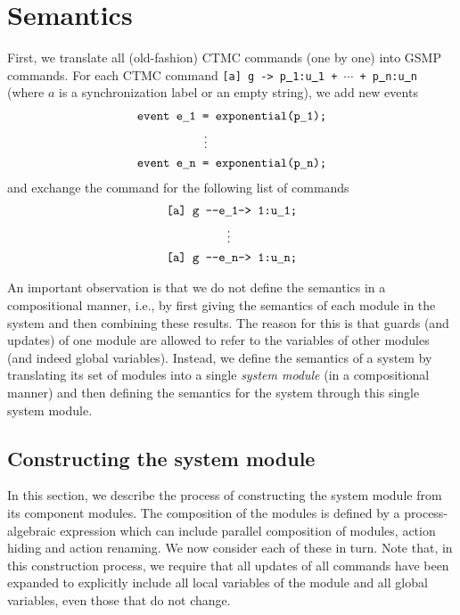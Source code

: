 \documentclass{article}
\renewcommand{\_}{\underline{~}}
\newcommand{\code}[1]{\texttt{#1}}
\begin{document}
\section*{Semantics}

First, we translate all (old-fashion) CTMC commands (one by one) into GSMP commands.
For each CTMC command \code{[a] g -> p\_1:u\_1 + $\cdots$ + p\_n:u\_n} (where $a$ is a synchronization label or an empty string), we add 
new events 
\begin{align*}
	\code{event e\_1 } &\code{= exponential(p\_1);} \\
	&\hspace*{0.47mm}\vdots \\
	\code{event e\_n } &\code{= exponential(p\_n);}
\end{align*}
and exchange the command for the following list of commands
\begin{align*}
	\code{[a] g } &\code{{-}{-}e\_1-> 1:u\_1;} \\
	&\hspace*{6.06mm}\vdots \\
	\code{[a] g } &\code{{-}{-}e\_n-> 1:u\_n;} 
\end{align*}

An important observation is that we do not define the semantics in a compositional manner, i.e., by first giving the semantics of each module in the system and then combining these results. 
The reason for this is that guards (and updates) of one module are allowed to refer to the variables of other modules (and indeed global variables). 
Instead, we define the semantics of a system by translating its set of modules into a single \emph{system module} (in a compositional manner) and then defining the semantics for the system through this single system module.


\subsection*{Constructing the system module}
In this section, we describe the process of constructing the system module from its component modules. 
The composition of the modules is defined by a process-algebraic expression which can include parallel composition of modules, action hiding and action renaming. 
We now consider each of these in turn. Note that, in this construction process, we require that all updates of all commands have been expanded to explicitly include all local variables of the module and all global variables, even those that do not change.
\end{document}

